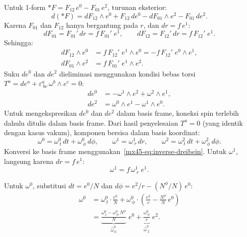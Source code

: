 Untuk 1-form $*F = F_{12}\,e^0 - F_{01}\,e^2$, turunan eksterior:
\begin{equation}
    d(*F) = dF_{12} \wedge e^0 + F_{12}\,de^0 - dF_{01} \wedge e^2 - F_{01}\,de^2. \label{mx45-eq:d-hodge-expanded}
\end{equation}
Karena $F_{01}$ dan $F_{12}$ hanya bergantung pada $r$, dan $dr = f\,e^1$:
\begin{equation}
    dF_{01} = F_{01}'\,dr = f\,F_{01}'\;e^1, \qquad dF_{12} = F_{12}'\,dr = f\,F_{12}'\;e^1. \label{mx45-eq:d-scalars}
\end{equation}
Sehingga:
\begin{align}
    dF_{12} \wedge e^0 &= f\,F_{12}'\;e^1 \wedge e^0 = -f\,F_{12}'\;e^0 \wedge e^1, \label{mx45-eq:dF12-e0}\\[4pt]
    dF_{01} \wedge e^2 &= f\,F_{01}'\;e^1 \wedge e^2. \label{mx45-eq:dF01-e2}
\end{align}
Suku $de^0$ dan $de^2$ dieliminasi menggunakan kondisi bebas torsi $T^a = de^a + \varepsilon^a_{\ bc}\,\omega^b \wedge e^c = 0$:
\begin{align}
    de^0 &= -\omega^1 \wedge e^2 + \omega^2 \wedge e^1, \label{mx45-eq:de0}\\[4pt]
    de^2 &= \omega^0 \wedge e^1 - \omega^1 \wedge e^0. \label{mx45-eq:de2}
\end{align}
Untuk mengekspresikan $de^0$ dan $de^2$ dalam basis frame, koneksi spin terlebih dahulu ditulis dalam basis frame. Dari hasil penyelesaian $T^a = 0$ (yang identik dengan kasus vakum), komponen bersisa dalam basis koordinat:
\begin{equation}
    \omega^0 = \omega^0_{\ t}\,dt + \omega^0_{\ \phi}\,d\phi, \qquad
    \omega^1 = \omega^1_{\ r}\,dr, \qquad
    \omega^2 = \omega^2_{\ t}\,dt + \omega^2_{\ \phi}\,d\phi.
\end{equation}
Konversi ke basis frame menggunakan~\eqref{mx45-eq:inverse-dreibein}. Untuk $\omega^1$, langsung karena $dr = f\,e^1$:
\begin{equation}
    \omega^1 = f\,\omega^1_{\ r}\;e^1. \label{mx45-eq:w1-frame}
\end{equation}

\noindent Untuk $\omega^0$, substitusi $dt = e^0/N$ dan $d\phi = e^2/r - (N^\phi/N)\,e^0$:
\begin{align}
    \omega^0 &= \omega^0_{\ t}\cdot\frac{e^0}{N} + \omega^0_{\ \phi}\cdot\left(\frac{e^2}{r} - \frac{N^\phi}{N}\,e^0\right) \nonumber\\[4pt]
    &= \underbrace{\frac{\omega^0_{\ t} - \omega^0_{\ \phi}\,N^\phi}{N}}_{\displaystyle \hat\omega^0_{\ 0}}\;e^0
    + \underbrace{\frac{\omega^0_{\ \phi}}{r}}_{\displaystyle \hat\omega^0_{\ 2}}\;e^2. \label{mx45-eq:w0-frame}
\end{align}


